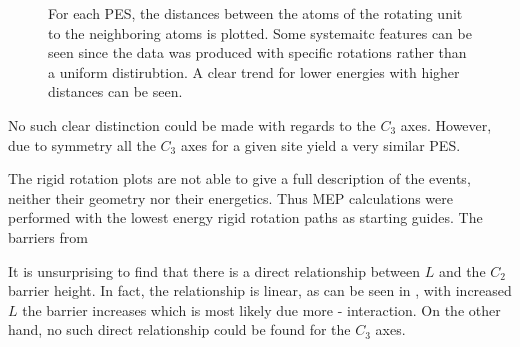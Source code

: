 \begin{figure}[h]
\begin{center}
    \parbox{0.85\linewidth}{
      \caption{For each PES, the distances between the  atoms of the rotating  unit to the neighboring  atoms is plotted.
Some systemaitc features can be seen since the data was produced with specific rotations rather than a uniform distirubtion.
A clear trend for lower energies with higher distances can be seen.
      }
      \label{fig:h-mg-distances}
    }
\end{center}
\end{figure}


No such clear distinction could be made with regards to the $C_3$ axes.
However, due to symmetry all the $C_3$ axes for a given site yield a very similar PES. 

The rigid rotation plots are not able to give a full description of the events, neither their geometry nor their energetics.
Thus MEP calculations were performed with the lowest energy rigid rotation paths as starting guides.
The barriers from 


It is unsurprising to find that there is a direct relationship between $L$ and the $C_2$ barrier height.
In fact, the relationship is linear, as can be seen in , with increased $L$ the barrier increases which is most likely due more - interaction.
On the other hand, no such direct relationship could be found for the $C_3$ axes.

\incomplete
